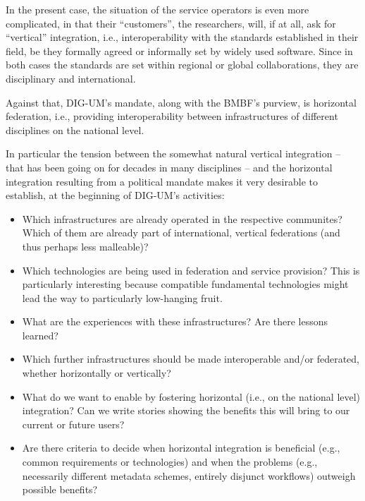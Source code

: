 \documentclass{article}
\begin{document}
In the present case, the situation of the service operators is even more
complicated, in that their ``customers'', the researchers, will, if at
all, ask for ``vertical'' integration, i.e., interoperability with
the standards established in their field, be they formally agreed or
informally set by widely used software.  Since in both cases the
standards are set within regional or global collaborations, they are
disciplinary and international.

Against that, DIG-UM's mandate, along with the BMBF's purview, is 
horizontal federation, i.e., providing interoperability between
infrastructures of different disciplines on the national level.

In particular the tension between the somewhat natural vertical
integration -- that has been going on for decades in many disciplines --
and the horizontal integration resulting from a political mandate makes
it very desirable to establish, at the beginning of DIG-UM's activities:

\begin{itemize}
\item Which infrastructures are already operated in the
respective communites?  Which of them are already part of international,
vertical federations (and thus perhaps less malleable)?

\item Which technologies are being used in federation and service
provision?  This is particularly interesting because compatible
fundamental technologies might lead the way to particularly low-hanging
fruit.

\item What are the experiences with these infrastructures?  Are there
lessons learned?

\item Which further infrastructures should be made interoperable and/or
federated, whether horizontally or vertically?

\item What do we want to enable by fostering horizontal (i.e., on the
national level) integration?  Can we write stories showing the
benefits this will bring to our current or future users?

\item Are there criteria to decide when horizontal integration is
beneficial (e.g., common requirements or technologies) and when the
problems (e.g., necessarily different metadata schemes, entirely
disjunct workflows) outweigh possible benefits?
\end{itemize}
\end{document}
